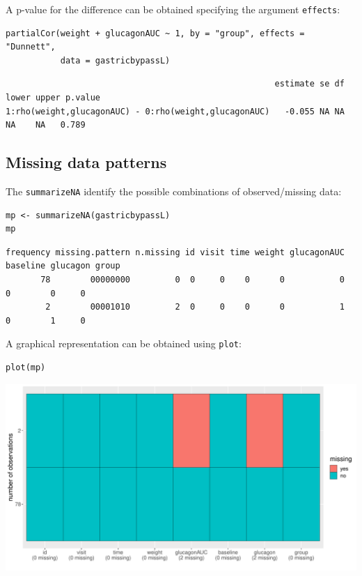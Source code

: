 \documentclass[12pt]{article}
\begin{document}
A p-value for the difference can be obtained specifying the argument
\texttt{effects}:
\lstset{language=r,label= ,caption= ,captionpos=b,numbers=none}
\begin{lstlisting}
partialCor(weight + glucagonAUC ~ 1, by = "group", effects = "Dunnett",
           data = gastricbypassL)
\end{lstlisting}

\begin{verbatim}
                                                      estimate se df lower upper p.value
1:rho(weight,glucagonAUC) - 0:rho(weight,glucagonAUC)   -0.055 NA NA    NA    NA   0.789
\end{verbatim}

\subsection{Missing data patterns}
\label{sec:org1b0c823}

The \texttt{summarizeNA} identify the possible combinations of
observed/missing data:
\lstset{language=r,label= ,caption= ,captionpos=b,numbers=none}
\begin{lstlisting}
mp <- summarizeNA(gastricbypassL)
mp
\end{lstlisting}

\begin{verbatim}
frequency missing.pattern n.missing id visit time weight glucagonAUC baseline glucagon group
       78        00000000         0  0     0    0      0           0        0        0     0
        2        00001010         2  0     0    0      0           1        0        1     0
\end{verbatim}


A graphical representation can be obtained using \texttt{plot}:
\lstset{language=r,label= ,caption= ,captionpos=b,numbers=none}
\begin{lstlisting}
plot(mp)
\end{lstlisting}

\begin{center}
\includegraphics[trim={0 0 0 0},width=1\textwidth]{./figures/summarizeNA.pdf}
\end{center}
\end{document}
